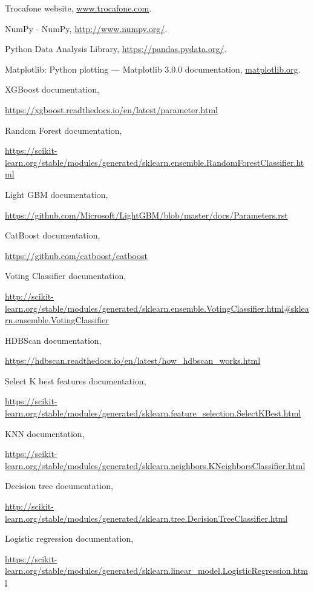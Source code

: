 \documentclass[a4paper ,12pt]{article}
\begin{document}
\begin{thebibliography}{99}
		
	\bibitem{}Trocafone website, \url{www.trocafone.com}.
	
	\bibitem{} NumPy - NumPy, \url{http://www.numpy.org/}.
	
	\bibitem{} Python Data Analysis Library,
	\url{https://pandas.pydata.org/}.
	
	\bibitem{}	Matplotlib: Python plotting — Matplotlib 3.0.0 documentation,
	\url{matplotlib.org}.


	\bibitem{} XGBoost documentation,

	\url{
	https://xgboost.readthedocs.io/en/latest/parameter.html}

	\bibitem{} Random Forest documentation,

	\url{
	https://scikit-learn.org/stable/modules/generated/sklearn.ensemble.RandomForestClassifier.html}

	\bibitem{} Light GBM documentation,

	\url{
	https://github.com/Microsoft/LightGBM/blob/master/docs/Parameters.rst}

	\bibitem{} CatBoost documentation,
	
	\url{
	https://github.com/catboost/catboost}

	\bibitem{} Voting Classifier documentation,

	\url{
	http://scikit-learn.org/stable/modules/generated/sklearn.ensemble.VotingClassifier.html#sklearn.ensemble.VotingClassifier}
	
	\bibitem{} HDBScan documentation,
	
	\url{
		https://hdbscan.readthedocs.io/en/latest/how\_hdbscan\_works.html}

	\bibitem{} Select K best features documentation,
	
	\url{
		https://scikit-learn.org/stable/modules/generated/sklearn.feature\_selection.SelectKBest.html}
	
	\bibitem{} KNN documentation,
	
	\url{
		https://scikit-learn.org/stable/modules/generated/sklearn.neighbors.KNeighborsClassifier.html}
	
	\bibitem{} Decision tree documentation,
	
	\url{
			http://scikit-learn.org/stable/modules/generated/sklearn.tree.DecisionTreeClassifier.html}
		
	\bibitem{} Logistic regression documentation,
		
	\url{
			https://scikit-learn.org/stable/modules/generated/sklearn.linear\_model.LogisticRegression.html}
		

\end{thebibliography}
\end{document}
